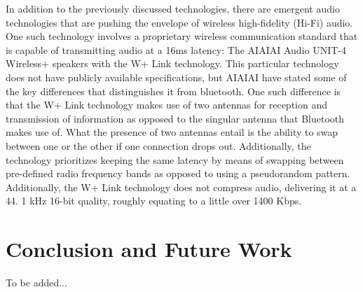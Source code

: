 \documentclass[conference]{IEEEtran}
\begin{document}
In addition to the previously discussed technologies, there are emergent audio technologies
that are pushing the envelope of wireless high-fidelity (Hi-Fi) audio. One such technology
involves a proprietary wireless communication standard that is capable of transmitting audio
at a 16ms latency: The AIAIAI Audio UNIT-4 Wireless+ speakers with the W+ Link technology.
This particular technology does not have publicly available specifications, but AIAIAI have
stated some of the key differences that distinguishes it from bluetooth. One such difference
is that the W+ Link technology makes use of two antennas for reception and transmission of
information as opposed to the singular antenna that Bluetooth makes use of. What the presence
of two antennas entail is the ability to swap between one or the other if one connection
drops out. Additionally, the technology prioritizes keeping the same latency by means of
swapping between pre-defined radio frequency bands as opposed to using a pseudorandom
pattern. Additionally, the W+ Link technology does not compress audio, delivering it at a 44.
1 kHz 16-bit quality, roughly equating to a little over 1400 Kbps.\cite{noauthor_unit-4_2023}

\section*{Conclusion and Future Work}

To be added...




\vspace{12pt}
\end{document}
